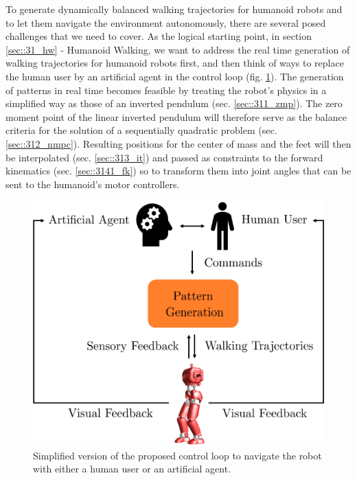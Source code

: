 To generate dynamically balanced walking trajectories for humanoid robots and to let them navigate the environment autonomously, there are several posed challenges that we need to cover. As the logical starting point, in section \ref{sec::31_hw} - Humanoid Walking, we want to address the real time generation of walking trajectories for humanoid robots first, and then think of ways to replace the human user by an artificial agent in the control loop (fig. \ref{fig::3_cl}). The generation of patterns in real time becomes feasible by treating the robot's physics in a simplified way as those of an inverted pendulum (sec. \ref{sec::311_zmp}). The zero moment point of the linear inverted pendulum will therefore serve as the balance criteria for the solution of a sequentially quadratic problem (sec. \ref{sec::312_nmpc}).  Resulting positions for the center of mass and the feet will then be interpolated (sec. \ref{sec::313_it}) and passed as constraints to the forward kinematics (sec. \ref{sec::3141_fk}) so to transform them into joint angles that can be sent to the humanoid's motor controllers.
\begin{figure}[h]
	\centering
	\includegraphics[scale=.5]{chapters/03_background/img/control_loop.png}
	\caption{\label{fig::3_cl} Simplified version of the proposed control loop to navigate the robot with either a human user or an artificial agent.}
\end{figure}
\\
